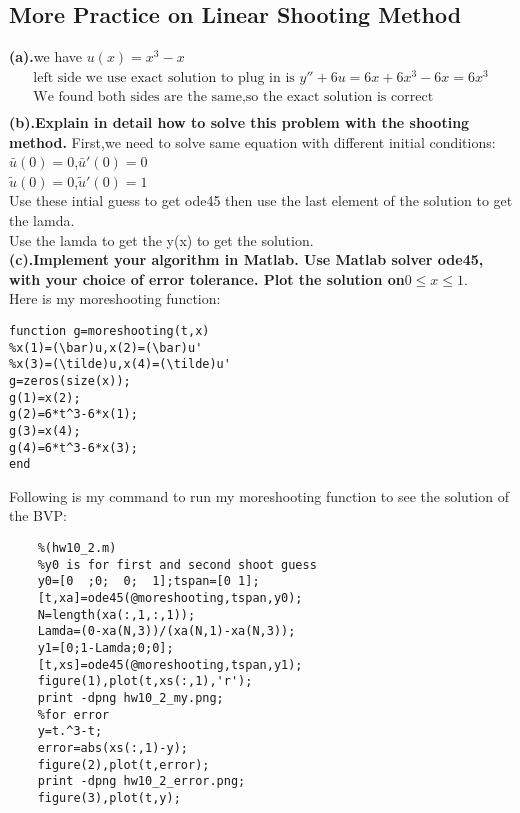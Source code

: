 \subsection{More Practice on Linear Shooting Method}
\textbf{(a).}we have $u(x)=x^3-x$
\[\begin{aligned}
    \text{left side we use exact solution to plug in is }y''+6u=6x+6x^3-6x=6x^3\\
    \text{We found both sides are the same,so the exact solution is correct}\\
\end{aligned}
\]
\textbf{(b).Explain in detail how to solve this problem with the shooting method.}
First,we need to solve same equation with different initial conditions:\\
$\bar{u}(0)=0$,$\bar{u}'(0)=0$\\
$\tilde{u}(0)=0$,$\tilde{u}'(0)=1$\\
Use these intial guess to get ode45 then use the last element of the solution to get the lamda.\\
Use the lamda to get the y(x) to get the solution.\\
\textbf{(c).Implement your algorithm in Matlab. Use Matlab solver ode45, with your choice of error
tolerance. Plot the solution on}$0 \leq x \leq 1$.\\
Here is my moreshooting function:
\begin{verbatim}
function g=moreshooting(t,x)
%x(1)=(\bar)u,x(2)=(\bar)u'
%x(3)=(\tilde)u,x(4)=(\tilde)u'
g=zeros(size(x));
g(1)=x(2);
g(2)=6*t^3-6*x(1);
g(3)=x(4);
g(4)=6*t^3-6*x(3);
end
\end{verbatim}
Following is my command to run my moreshooting function to see the solution of the BVP:
\begin{verbatim}
    %(hw10_2.m)
    %y0 is for first and second shoot guess
    y0=[0  ;0;  0;  1];tspan=[0 1];
    [t,xa]=ode45(@moreshooting,tspan,y0);
    N=length(xa(:,1,:,1));
    Lamda=(0-xa(N,3))/(xa(N,1)-xa(N,3));
    y1=[0;1-Lamda;0;0];
    [t,xs]=ode45(@moreshooting,tspan,y1);
    figure(1),plot(t,xs(:,1),'r');
    print -dpng hw10_2_my.png;
    %for error
    y=t.^3-t;
    error=abs(xs(:,1)-y);
    figure(2),plot(t,error);
    print -dpng hw10_2_error.png;
    figure(3),plot(t,y);
\end{verbatim}
\newpage
